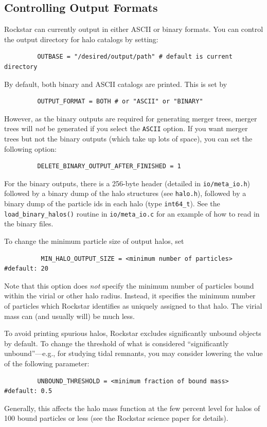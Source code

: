 \documentclass[12pt]{article}
\begin{document}
\subsection{Controlling Output Formats}
\label{s:output_formats}
      Rockstar can currently output in either ASCII or binary formats.
      You can control the output directory for halo catalogs by setting:
\begin{verbatim}
         OUTBASE = "/desired/output/path" # default is current directory
\end{verbatim}
      By default, both binary and ASCII catalogs are printed.  This is set by
\begin{verbatim}
         OUTPUT_FORMAT = BOTH # or "ASCII" or "BINARY"
\end{verbatim}
      However, as the binary outputs are required for generating merger trees,
      merger trees will \textit{not} be generated if you select the \texttt{ASCII} option.
      If you want merger trees but not the binary outputs (which take up
      lots of space), you can set the following option:
\begin{verbatim}
         DELETE_BINARY_OUTPUT_AFTER_FINISHED = 1
\end{verbatim}
      For the binary outputs, there is a 256-byte header (detailed in
      \texttt{io/meta\_io.h}) followed by a binary dump of the halo structures
      (see \texttt{halo.h}), followed by a binary dump of the particle ids in
      each halo (type \texttt{int64\_t}).  See the \texttt{load\_binary\_halos()} routine in
      \texttt{io/meta\_io.c} for an example of how to read in the binary files.

      To change the minimum particle size of output halos, set
\begin{verbatim}
          MIN_HALO_OUTPUT_SIZE = <minimum number of particles> #default: 20
\end{verbatim}
      Note that this option does \textit{not} specify the minimum number of particles
      bound within the virial or other halo radius.  Instead, it specifies the
      minimum number of particles which Rockstar identifies as uniquely assigned
      to that halo.  The virial mass can (and usually will) be much less.

      To avoid printing spurious halos, Rockstar excludes significantly 
      unbound objects by default.  To change the threshold of what is considered
      ``significantly unbound''---e.g., for studying tidal remnants, you may
      consider lowering the value of the following parameter:      
\begin{verbatim}
      	 UNBOUND_THRESHOLD = <minimum fraction of bound mass> #default: 0.5
\end{verbatim}
      Generally, this affects the halo mass function at the few percent level
      for halos of 100 bound particles or less (see the Rockstar science paper for details).
\end{document}
